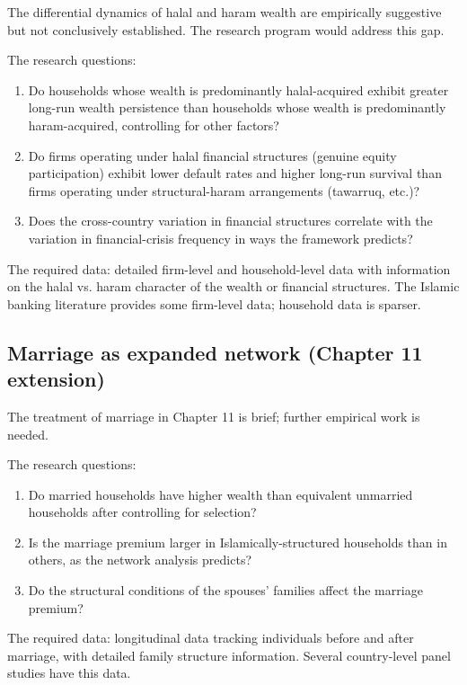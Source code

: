 The differential dynamics of halal and haram wealth are
empirically suggestive but not conclusively established. The
research program would address this gap.

The research questions:

\begin{enumerate}[leftmargin=2em]
    \item Do households whose wealth is predominantly
    halal-acquired exhibit greater long-run wealth persistence
    than households whose wealth is predominantly haram-acquired,
    controlling for other factors?
    \item Do firms operating under halal financial structures
    (genuine equity participation) exhibit lower default rates
    and higher long-run survival than firms operating under
    structural-haram arrangements (tawarruq, etc.)?
    \item Does the cross-country variation in financial structures
    correlate with the variation in financial-crisis frequency
    in ways the framework predicts?
\end{enumerate}

The required data: detailed firm-level and household-level data
with information on the halal vs. haram character of the wealth
or financial structures. The Islamic banking literature provides
some firm-level data; household data is sparser.

\subsection{Marriage as expanded network (Chapter 11 extension)}

The treatment of marriage in Chapter 11 is brief; further
empirical work is needed.

The research questions:

\begin{enumerate}[leftmargin=2em]
    \item Do married households have higher wealth than equivalent
    unmarried households after controlling for selection?
    \item Is the marriage premium larger in Islamically-structured
    households than in others, as the network analysis predicts?
    \item Do the structural conditions of the spouses' families
    affect the marriage premium?
\end{enumerate}

The required data: longitudinal data tracking individuals before
and after marriage, with detailed family structure information.
Several country-level panel studies have this data.

